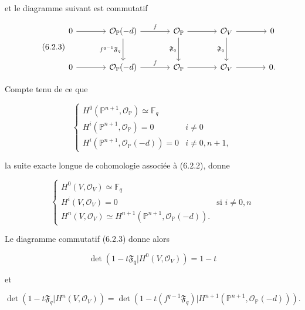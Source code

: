 et le diagramme suivant est commutatif

\begin{equation}\tag{6.2.3}
\begin{tikzcd}[column sep=large,row sep=large]
0 \arrow[r] &
\mathcal O_{\mathbb P}(-d) \arrow[r,"f"] \arrow[d,"f^{q-1}\mathfrak F_q"'] &
\mathcal O_{\mathbb P} \arrow[r] \arrow[d,"\mathfrak F_q"'] &
\mathcal O_V \arrow[r] \arrow[d,"\mathfrak F_q"'] &
0\\
0 \arrow[r] &
\mathcal O_{\mathbb P}(-d) \arrow[r,"f"] &
\mathcal O_{\mathbb P} \arrow[r] &
\mathcal O_V \arrow[r] &
0 .
\end{tikzcd}
\end{equation}


Compte tenu de ce que

\begin{equation}\tag{6.2.4}
\begin{cases}
H^0(\mathbb P^{n+1},\mathcal O_{\mathbb P})\simeq\mathbb F_q\\
H^i(\mathbb P^{n+1},\mathcal O_{\mathbb P})=0&i\ne0\\
H^i(\mathbb P^{n+1},\mathcal O_{\mathbb P}(-d))=0&i\ne0,n+1,
\end{cases}
\end{equation}

la suite exacte longue de cohomologie associée à (6.2.2), donne

\begin{equation}\tag{6.2.5}
\begin{cases}
H^0(V,\mathcal O_V)\simeq\mathbb F_q\\
H^i(V,\mathcal O_V)=0&\text{si }i\ne0,n\\
H^n(V,\mathcal O_V)
\simeq H^{n+1}(\mathbb P^{n+1},\mathcal O_{\mathbb P}(-d)).
\end{cases}
\end{equation}

Le diagramme commutatif (6.2.3) donne alors

\begin{equation}\tag{6.2.6}
\det\!\left(1-t\mathfrak F_q
\mathrel{\Big|}H^0(V,\mathcal O_V)\right)=1-t
\end{equation}

et

\begin{equation}\tag{6.2.7}
\det\!\left(1-t\mathfrak F_q
\mathrel{\Big|}H^n(V,\mathcal O_V)\right)
=
\det\!\left(
1-t(f^{q-1}\mathfrak F_q)
\mathrel{\Big|}
H^{n+1}(\mathbb P^{n+1},\mathcal O_{\mathbb P}(-d))
\right).
\end{equation}

